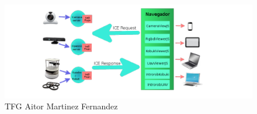 \begin{figure}[!h]
    \centering
    \includegraphics[width=150mm]{img/introduccion/jdro.png}
    \caption{TFG Aitor Martinez Fernandez}
\end{figure}
